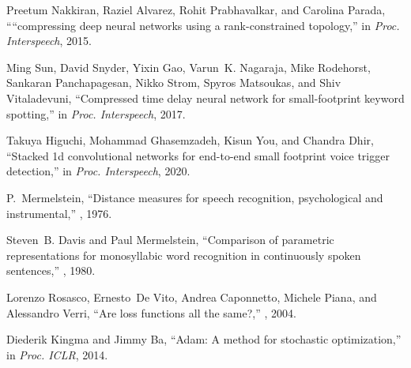 \documentclass{article}
\begin{document}
\begin{thebibliography}{10}
Preetum Nakkiran, Raziel Alvarez, Rohit Prabhavalkar, and Carolina Parada,
\newblock ``“compressing deep neural networks using a rank-constrained
  topology,''
\newblock in {\em Proc. Interspeech}, 2015.

Ming Sun, David Snyder, Yixin Gao, Varun~K. Nagaraja, Mike Rodehorst, Sankaran
  Panchapagesan, Nikko Strom, Spyros Matsoukas, and Shiv Vitaladevuni,
\newblock ``Compressed time delay neural network for small-footprint keyword
  spotting,''
\newblock in {\em Proc. Interspeech}, 2017.

Takuya Higuchi, Mohammad Ghasemzadeh, Kisun You, and Chandra Dhir,
\newblock ``Stacked 1d convolutional networks for end-to-end small footprint
  voice trigger detection,''
\newblock in {\em Proc. Interspeech}, 2020.

P.~Mermelstein,
\newblock ``Distance measures for speech recognition, psychological and
  instrumental,''
, 1976.

Steven~B. Davis and Paul Mermelstein,
\newblock ``Comparison of parametric representations for monosyllabic word
  recognition in continuously spoken sentences,''
, 1980.

Lorenzo Rosasco, Ernesto~De Vito, Andrea Caponnetto, Michele Piana, and
  Alessandro Verri,
\newblock ``Are loss functions all the same?,''
, 2004.

Diederik Kingma and Jimmy Ba,
\newblock ``Adam: A method for stochastic optimization,''
\newblock in {\em Proc. ICLR}, 2014.

\end{thebibliography}
\end{document}
